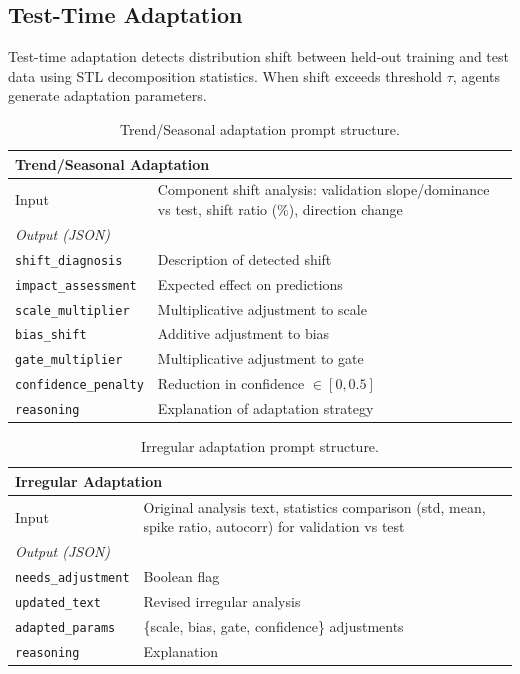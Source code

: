 \subsection{Test-Time Adaptation}

Test-time adaptation detects distribution shift between held-out training and test data using STL decomposition statistics. When shift exceeds threshold $\tau$, agents generate adaptation parameters.

\begin{table}[h!]
\centering
\scriptsize
\setlength{\tabcolsep}{3pt}
\begin{tabular}{p{2.2cm}p{4.8cm}}
\toprule
\multicolumn{2}{l}{\textbf{Trend/Seasonal Adaptation}} \\
\midrule
Input & Component shift analysis: validation slope/dominance vs test, shift ratio (\%), direction change \\
\midrule
\multicolumn{2}{l}{\textit{Output (JSON)}} \\
\texttt{shift\_diagnosis} & Description of detected shift \\
\texttt{impact\_assessment} & Expected effect on predictions \\
\texttt{scale\_multiplier} & Multiplicative adjustment to scale \\
\texttt{bias\_shift} & Additive adjustment to bias \\
\texttt{gate\_multiplier} & Multiplicative adjustment to gate \\
\texttt{confidence\_penalty} & Reduction in confidence $\in [0, 0.5]$ \\
\texttt{reasoning} & Explanation of adaptation strategy \\
\bottomrule
\end{tabular}
\caption{Trend/Seasonal adaptation prompt structure.}
\label{tab:prompt_adapt_ts}
\end{table}

\begin{table}[h!]
\centering
\scriptsize
\setlength{\tabcolsep}{3pt}
\begin{tabular}{p{2.2cm}p{4.8cm}}
\toprule
\multicolumn{2}{l}{\textbf{Irregular Adaptation}} \\
\midrule
Input & Original analysis text, statistics comparison (std, mean, spike ratio, autocorr) for validation vs test \\
\midrule
\multicolumn{2}{l}{\textit{Output (JSON)}} \\
\texttt{needs\_adjustment} & Boolean flag \\
\texttt{updated\_text} & Revised irregular analysis \\
\texttt{adapted\_params} & \{scale, bias, gate, confidence\} adjustments \\
\texttt{reasoning} & Explanation \\
\bottomrule
\end{tabular}
\caption{Irregular adaptation prompt structure.}
\label{tab:prompt_adapt_irreg}
\end{table}

